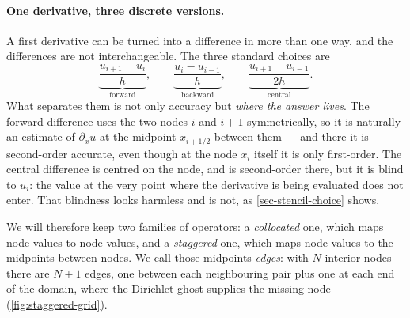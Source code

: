 \documentclass[a5paper]{article}
\begin{document}
\paragraph{One derivative, three discrete versions.} A first derivative can be turned into a difference in more than one way, and the differences are not interchangeable. The three standard choices are
\begin{equation}
    \label{eq:three-differences}
    \underbrace{\frac{u_{i+1}-u_i}{h}}_{\text{forward}},
    \qquad
    \underbrace{\frac{u_i-u_{i-1}}{h}}_{\text{backward}},
    \qquad
    \underbrace{\frac{u_{i+1}-u_{i-1}}{2h}}_{\text{central}}.
\end{equation}
What separates them is not only accuracy but \emph{where the answer lives}. The forward difference uses the two nodes $i$ and $i+1$ symmetrically, so it is naturally an estimate of $\partial_xu$ at the midpoint $x_{i+1/2}$ between them --- and there it is second-order accurate, even though at the node $x_i$ itself it is only first-order. The central difference is centred on the node, and is second-order there, but it is blind to $u_i$: the value at the very point where the derivative is being evaluated does not enter. That blindness looks harmless and is not, as \cref{sec-stencil-choice} shows.

We will therefore keep two families of operators: a \emph{collocated} one, which maps node values to node values, and a \emph{staggered} one, which maps node values to the midpoints between nodes. We call those midpoints \emph{edges}: with $N$ interior nodes there are $N+1$ edges, one between each neighbouring pair plus one at each end of the domain, where the Dirichlet ghost supplies the missing node (\cref{fig:staggered-grid}).
\end{document}
